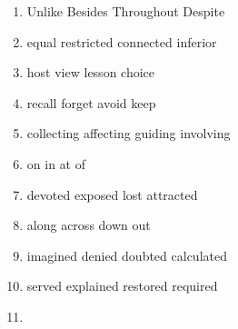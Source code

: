\begin{enumerate}
	\item


\fourchoices
{Unlike}
{Besides}
{Throughout}
{Despite}




\item


\fourchoices
{equal}
{restricted}
{connected}
{inferior}




\item


\fourchoices
{host}
{view}
{lesson}
{choice}




\item


\fourchoices
{recall}
{forget}
{avoid}
{keep}




\item

\fourchoices
{collecting}
{affecting}
{guiding}
{involving}


\item


\fourchoices
{on}
{in}
{at}
{of}




\item


\fourchoices
{devoted}
{exposed}
{lost}
{attracted}




\item


\fourchoices
{along}
{across}
{down}
{out}




\item


\fourchoices
{imagined}
{denied}
{doubted}
{calculated}




\item


\fourchoices
{served}
{explained}
{restored}
{required}




\item



\end{enumerate}
